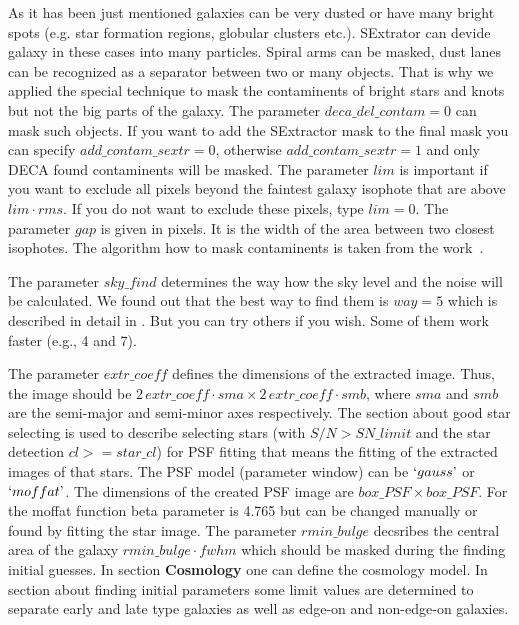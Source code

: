 \documentclass[
aps,%
12pt,%
final,%
notitlepage,%
oneside,%
onecolumn,%
nobibnotes,%
nofootinbib,%
superscriptaddress,%
noshowpacs,%
centertags]%
{revtex4}
\begin{document}
As it has been just mentioned galaxies can be very dusted or have many bright spots (e.g. star formation regions, globular clusters etc.). SExtrator can devide galaxy in these cases into many particles. Spiral arms can be masked, dust lanes can be recognized as a separator between two or many objects. That is why we applied the special technique to mask the contaminents of bright stars and knots but not the big parts of the galaxy. The parameter $deca\_del\_contam=0$ can mask such objects. If you want to add the SExtractor mask to the final mask you can specify $add\_contam\_sextr=0$, otherwise $add\_contam\_sextr=1$ and only DECA found contaminents will be masked. The parameter $lim$ is important if you want to exclude all pixels beyond the faintest galaxy isophote that are above $lim\cdot rms$. If you do not want to exclude these pixels, type $lim=0$. The parameter $gap$ is given in pixels. It is the width of the area between two closest isophotes. The algorithm how to mask contaminents is taken from the work~\cite{Vikram}. 

The parameter $sky\_find$ determines the way how the sky level and the noise will be calculated. We found out that the best way to find them is $way=5$ which is described in detail in \cite{Navarro}. But you can try others if you wish. Some of them work faster (e.g., 4 and 7).

The parameter $extr\_coeff$ defines the dimensions of the extracted image. Thus, the image should be $2\,extr\_coeff\cdot sma \times 2\,extr\_coeff\cdot smb$, where $sma$ and $smb$ are the semi-major and semi-minor axes respectively. 
The section about good star selecting is used to describe selecting stars (with $S/N>SN\_limit$ and the star detection $cl>=star\_cl$)  for PSF fitting that means the fitting of the extracted images of that stars. The PSF model (parameter window) can be $`gauss\textrm'$ or $`moffat\textrm'$. The dimensions of the created PSF image are $box\_PSF\times box\_PSF$. For the moffat function beta parameter is 4.765 but can be changed manually or found by fitting the star image.
The parameter $rmin\_bulge$ decsribes the central area of the galaxy $rmin\_bulge\cdot fwhm$ which should be masked during the finding initial guesses.
In section \textbf{Cosmology} one can define the cosmology model.
In section about finding initial parameters some limit values are determined to separate early and late type galaxies as well as edge-on and non-edge-on galaxies.
\end{document}

